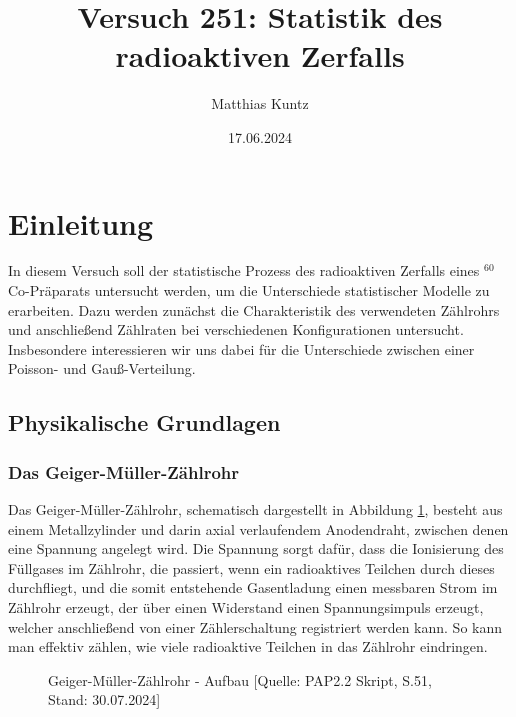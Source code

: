 \documentclass{article}
\title{Versuch 251: Statistik des radioaktiven Zerfalls}
\author{Matthias Kuntz}
\date{17.06.2024}
\begin{document}
\maketitle

\tableofcontents

\newpage

\section{Einleitung}

In diesem Versuch soll der statistische Prozess des radioaktiven Zerfalls eines $^{60}$Co-Präparats untersucht werden, um die Unterschiede statistischer Modelle zu erarbeiten. Dazu werden zunächst die Charakteristik des verwendeten Zählrohrs und anschließend Zählraten bei verschiedenen Konfigurationen untersucht. Insbesondere interessieren wir uns dabei für die Unterschiede zwischen einer Poisson- und Gauß-Verteilung. 


\subsection{Physikalische Grundlagen}

\subsubsection{Das Geiger-Müller-Zählrohr}

Das Geiger-Müller-Zählrohr, schematisch dargestellt in Abbildung \ref{fig:gm-zählrohr}, besteht aus einem Metallzylinder und darin axial verlaufendem Anodendraht, zwischen denen eine Spannung angelegt wird. Die Spannung sorgt dafür, dass die Ionisierung des Füllgases im Zählrohr, die passiert, wenn ein radioaktives Teilchen durch dieses durchfliegt, und die somit entstehende Gasentladung einen messbaren Strom im Zählrohr erzeugt, der über einen Widerstand einen Spannungsimpuls erzeugt, welcher anschließend von einer Zählerschaltung registriert werden kann. So kann man effektiv zählen, wie viele radioaktive Teilchen in das Zählrohr eindringen. 

\begin{figure}[!b]
    \centering
    \caption{Geiger-Müller-Zählrohr - Aufbau [Quelle: PAP2.2 Skript, S.51, Stand: 30.07.2024]}
    \label{fig:gm-zählrohr}
\end{figure}
\end{document}
